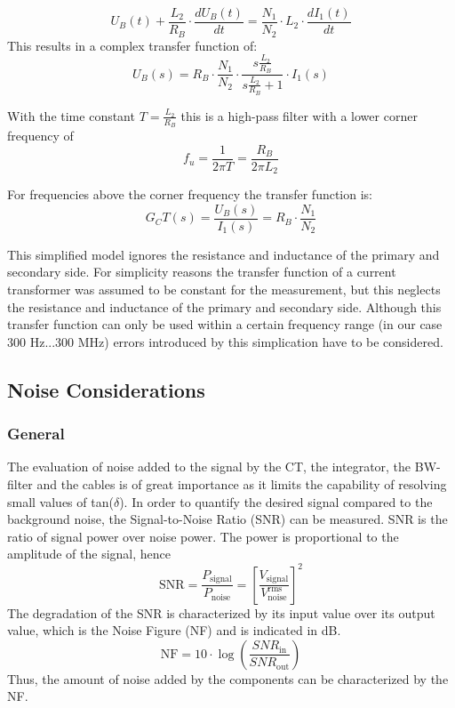 \begin{equation}
U_B(t) + \frac{L_2}{R_B} \cdot \frac{dU_B(t)}{dt}=\frac{N_1}{N_2} \cdot L_2 \cdot \frac{dI_1(t)}{dt}
\end{equation}
This results in a complex transfer function of: 
\begin{equation}
U_B(s) = R_B \cdot \frac{N_1}{N_2} \cdot \frac{s \frac{L_2}{R_B}}{s \frac{L_2}{R_B} +1} \cdot I_1(s)
\end{equation}

With the time constant $T=\frac{L_2}{R_B}$ this is a high-pass filter with a lower corner frequency of 
\begin{equation}
f_u= \frac{1}{2 \pi T} = \frac{R_B}{2 \pi L_2}
\end{equation}

For frequencies above the corner frequency the transfer function is:
\begin{equation}
G_CT(s) = \frac{U_B(s)}{I_1(s)}=R_B \cdot \frac{N_1}{N_2}
\end{equation}

This simplified model ignores the resistance and inductance of the primary and secondary side. 
For simplicity reasons the transfer function of a current transformer was assumed to be constant for the measurement, but this neglects the resistance and inductance of the primary and secondary side. Although this transfer function can only be used within a certain frequency range (in our case 300 Hz...300 MHz) errors introduced by this simplication have to be considered. 


\subsection{Noise Considerations}
\subsubsection{General}
The evaluation of noise added to the signal by the CT, the integrator, the BW-filter and the cables is of great importance as it limits the capability of resolving small values of tan($\delta$).
In order to quantify the desired signal compared to the background noise, the Signal-to-Noise Ratio (SNR) can be measured. SNR is  the ratio of signal power over noise power. The power is proportional to the amplitude of the signal, hence
\begin{equation}
	\textrm{SNR}=\frac{P_{\textrm{signal}}}{P_{\textrm{noise}}} = \left[\frac{V_{\textrm{signal}}}{V_{\textrm{noise}}^{\textrm{rms}}}\right]^2
\end{equation}
The degradation of the SNR is characterized by its input value over its output value, which is the Noise Figure (NF) and is indicated in dB.
\begin{equation}
	\textrm{NF} = 10\cdot \log\left(\frac{SNR_{\textrm{in}}}{SNR_{\textrm{out}}}\right)
\end{equation}
Thus, the amount of noise added by the components can be characterized by the NF. 


